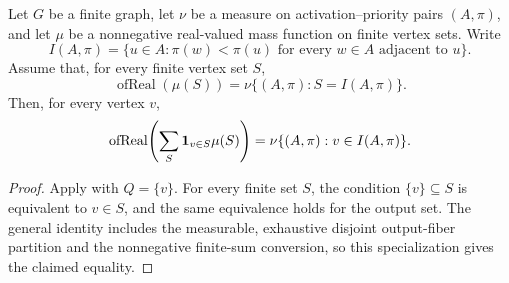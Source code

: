 \begin{helper}
Let $G$ be a finite graph, let $\nu$ be a measure on activation--priority
pairs $(A,\pi)$, and let $\mu$ be a nonnegative real-valued mass function on
finite vertex sets.  Write
\[
I(A,\pi)=\{u\in A:\pi(w)<\pi(u)\text{ for every }w\in A
\text{ adjacent to }u\}.
\]
Assume that, for every finite vertex set $S$,
\[
\operatorname{ofReal}(\mu(S))=\nu\{(A,\pi):S=I(A,\pi)\}.
\]
Then, for every vertex $v$,
\[
\operatorname{ofReal}\!\left(\sum_S {\bf 1}_{v\in S}\mu(S)\right)
=
\nu\{(A,\pi):v\in I(A,\pi)\}.
\]
\end{helper}
\begin{proof}
Apply  with $Q=\{v\}$.
For every finite set $S$, the condition $\{v\}\subseteq S$ is equivalent
to $v\in S$, and the same equivalence holds for the output set.
The general identity includes the measurable, exhaustive disjoint
output-fiber partition and the nonnegative finite-sum conversion, so this
specialization gives the claimed equality.
\end{proof}

